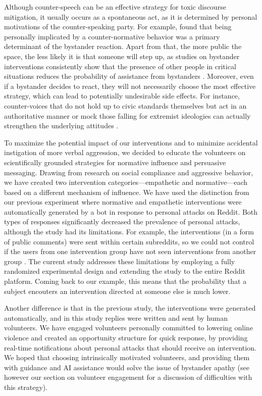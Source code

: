 \documentclass[preprint,12pt]{elsarticle}
\begin{document}
 
Although counter-speech can be an effective strategy for toxic discourse mitigation, it usually occurs as a spontaneous act, as it is determined by personal motivations of the counter-speaking party. For example, \citet{brauer2010descriptive} found that being personally implicated by a counter-normative behavior was a primary determinant of the bystander reaction. Apart from that, the more public the space, the less likely it is that someone will step up, as studies on bystander interventions consistently show that the presence of other people in critical situations reduces the probability of assistance from bystanders \citep{fischer2011bystander}. Moreover, even if a bystander decides to react, they will not necessarily choose the most effective strategy, which can lead to potentially undesirable side effects. 
For instance, counter-voices that do not hold up to civic standards themselves but act in an authoritative manner or mock those falling for extremist ideologies can actually strengthen the underlying attitudes \citep{ziegele2018journalistic, schieb2016governing, legault2011ironic}. 
 


To maximize the potential impact of our interventions and to minimize accidental instigation of more verbal aggression, we decided to educate the volunteers on scientifically grounded strategies for normative influence and persuasive messaging. Drawing from research on social compliance and aggressive behavior, we have created two intervention categories---empathetic and normative---each based on a different mechanism of influence. We have used the distinction from our previous experiment where normative and empathetic interventions were automatically generated by a bot in response to personal attacks on Reddit. Both types of responses significantly decreased the prevalence of personal attacks, although the study had its limitations. For example, the interventions (in a form of public comments) were sent within certain subreddits, so we could not control if the users from one intervention group have not seen interventions from another group 
\citep{bilewicz2021artificial}. The current study addresses these limitations by employing a fully randomized experimental design and extending the study to the entire Reddit platform. Coming back to our example, this means that the probability that a subject encouters an intervention directed at someone else is much lower.

Another difference is that in the previous study, the interventions were generated automatically, and in this study replies were written and sent by human volunteers. We have engaged volunteers personally committed to lowering online violence and created an opportunity structure for quick response, by providing real-time notifications about personal attacks that should receive an intervention. We hoped that choosing intrinsically motivated volunteers, and providing them with guidance and AI assistance would solve the issue of bystander apathy (see however our section on volunteer engagement for a discussion of difficulties with this strategy).
\end{document}
